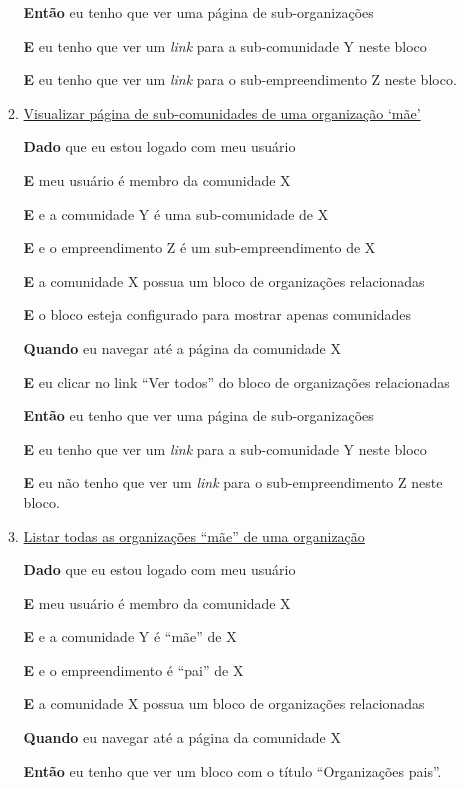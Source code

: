 \begin{enumerate}
\begin{enumerate}
\textbf{Então} eu tenho que ver uma página de sub-organizações

\textbf{E} eu tenho que ver um \textit{link} para a sub-comunidade Y neste
bloco

\textbf{E} eu tenho que ver um \textit{link} para o sub-empreendimento Z
neste bloco.

\item \underline{Visualizar página de sub-comunidades de uma organização `mãe'}

\textbf{Dado} que eu estou logado com meu usuário

\textbf{E} meu usuário é membro da comunidade X

\textbf{E} e a comunidade Y é uma sub-comunidade de X

\textbf{E} e o empreendimento Z é um sub-empreendimento de X

\textbf{E} a comunidade X possua um bloco de organizações relacionadas

\textbf{E} o bloco esteja configurado para mostrar apenas comunidades

\textbf{Quando} eu navegar até a página da comunidade X

\textbf{E} eu clicar no link ``Ver todos'' do bloco de organizações relacionadas

\textbf{Então} eu tenho que ver uma página de sub-organizações

\textbf{E} eu tenho que ver um \textit{link} para a sub-comunidade Y neste
bloco

\textbf{E} eu não tenho que ver um \textit{link} para o sub-empreendimento Z
neste bloco.

\item \underline{Listar todas as organizações ``mãe'' de uma organização}

\textbf{Dado} que eu estou logado com meu usuário

\textbf{E} meu usuário é membro da comunidade X

\textbf{E} e a comunidade Y é ``mãe'' de X

\textbf{E} e o empreendimento é ``pai'' de X

\textbf{E} a comunidade X possua um bloco de organizações relacionadas

\textbf{Quando} eu navegar até a página da comunidade X

\textbf{Então} eu tenho que ver um bloco com o título ``Organizações pais''.


\end{enumerate}
\end{enumerate}
